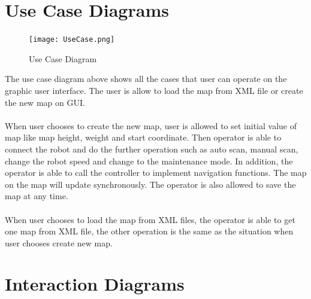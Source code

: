 \documentclass[11pt, a4paper]{report}
\begin{document}
\section{Use Case Diagrams}
\begin{figure}[h]
  \centering
    \texttt{[image: UseCase.png]}
  \caption{Use Case Diagram}
\end{figure}
The use case diagram above shows all the cases that user can operate on the graphic user interface. The user is allow to load the map from XML file or create the new map on GUI. \\ \\
When user chooses to create the new map, user is  allowed to set initial value of map like map height, weight and start coordinate. Then operator is able to connect the robot and do the further operation such as auto scan, manual scan, change the robot speed and change to the maintenance mode. In addition, the operator is able to call the controller to implement navigation functions. The map on the map will update synchronously. The operator is also allowed to save the map at any time.  \\ \\ 
When user chooses to load the map from XML files, the operator is able to get one map from XML file, the other operation is the same as the situation when user chooses create new map.
\newpage


\section{Interaction Diagrams}
\end{document}
